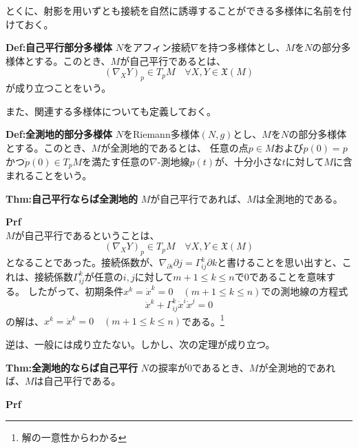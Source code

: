 \documentclass[a4paper,11pt]{jsarticle}
\numberwithin{equation}{section}
\begin{document}
とくに、射影を用いずとも接続を自然に誘導することができる多様体に名前を付けておく。
\begin{itembox}[l]{\textbf{Def:自己平行部分多様体}}
    $N$をアフィン接続$\nabla$を持つ多様体とし、$M$を$N$の部分多様体とする。このとき、$M$が自己平行であるとは、
    \begin{equation}
        (\nabla_X Y)_p \in T_pM \quad \forall X,Y \in \mathfrak{X}(M)
    \end{equation}
    が成り立つことをいう。

\end{itembox}
また、関連する多様体についても定義しておく。

\begin{itembox}[l]{\textbf{Def:全測地的部分多様体}}
    $N$をRiemann多様体$(N,g)$とし、$M$を$N$の部分多様体とする。このとき、$M$が全測地的であるとは、
    任意の点$p \in M$および$p(0) =p$かつ$\dot{p}(0) \in T_pM$を満たす任意の$\nabla$-測地線$p(t)$が、十分小さな$t$に対して$M$に含まれることをいう。
\end{itembox}

\begin{itembox}[l]{\textbf{Thm:自己平行ならば全測地的}}
    $M$が自己平行であれば、$M$は全測地的である。
\end{itembox}
\textbf{Prf}\\
$M$が自己平行であるということは、
\begin{equation}
    (\nabla_X Y)_p \in T_pM \quad \forall X,Y \in \mathfrak{X}(M)
\end{equation}
となることであった。接続係数が、$\nabla_{\partial{i}}\partial{j} = \Gamma_{ij}^k\partial{k}$と書けることを思い出すと、これは、接続係数$\Gamma_{ij}^k$が任意の$i,j$に対して$m+1 \leq k \leq n$で$0$であることを意味する。
したがって、初期条件$x^k =\dot{x}^k = 0 \quad (m+1 \leq k \leq n)$での測地線の方程式
\begin{equation}
    \ddot{x}^k + \Gamma_{ij}^k \dot{x}^i \dot{x}^j = 0
\end{equation}
の解は、$x^k = \dot{x}^k = 0 \quad (m+1 \leq k \leq n)$である。\footnote{解の一意性からわかる}\hfill\qedsymbol

逆は、一般には成り立たない。しかし、次の定理が成り立つ。
\begin{itembox}[l]{\textbf{Thm:全測地的ならば自己平行}}
    $N$の捩率が0であるとき、$M$が全測地的であれば、$M$は自己平行である。
\end{itembox}
\textbf{Prf}\\
\end{document}
